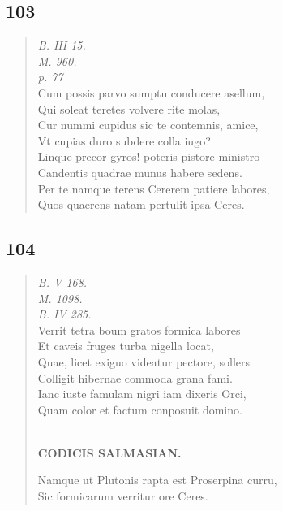 \documentclass[11pt, a4paper]{report}
\begin{document}
            \subsection*{103}
      \begin{verse}
      \textit{B. III 15.} \\ \textit{M. 960.} \\ \textit{p. 77} \\ Cum possis parvo sumptu conducere asellum, \\ Qui soleat teretes volvere rite molas, \\ Cur nummi cupidus sic te contemnis, amice, \\ Vt cupias duro subdere colla iugo? \\ Linque precor gyros! poteris pistore ministro \\ Candentis quadrae munus habere sedens. \\ Per te namque terens Cererem patiere labores, \\ Quos quaerens natam pertulit ipsa Ceres. \\ 
      \end{verse}
  
            \subsection*{104}
      \begin{verse}
      \textit{B. V 168.} \\ \textit{M. 1098.} \\ \textit{B. IV 285.} \\ Verrit tetra boum gratos formica labores \\ Et caveis fruges turba nigella locat, \\ Quae, licet exiguo videatur pectore, sollers \\ Colligit hibernae commoda grana fami. \\ Ianc iuste famulam nigri iam dixeris Orci, \\ Quam color et factum conposuit domino. \\ 
        ﻿\pagebreak 
    \begin{center} \textbf{CODICIS SALMASIAN.} \end{center} \marginpar{[127]} Namque ut Plutonis rapta est Proserpina curru, \\ Sic formicarum verritur ore Ceres. \\ 
      \end{verse}
  
\end{document}
